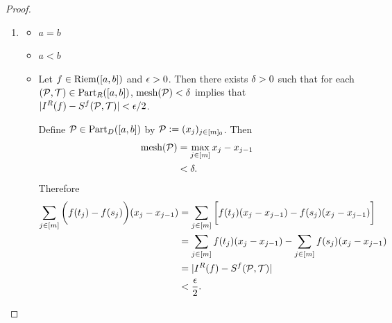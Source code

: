 \documentclass{book}
\begin{document}
	\begin{proof}\
		\begin{enumerate}
			\item 
			\begin{itemize}
				\item $a =b$
				\item $a < b$  
				\item Let $f \in \text{Riem}([a,b])$ and $\epsilon > 0$. Then there exists $\delta > 0$ such that for each $(\mathcal{P}, \mathcal{T}) \in \text{Part}_R([a,b])$, $\text{mesh}(\mathcal{P}) < \delta$ implies that $|I^R(f) - S^f(\mathcal{P}, \mathcal{T})| < \epsilon/2$. 
				
				Define $\mathcal{P} \in \text{Part}_D([a,b])$ by $\mathcal{P} \vcentcolon= (x_j)_{j \in [m]_0}$. Then 
				\begin{align*}
					\text{mesh}(\mathcal{P})
					& = \max\limits_{j \in [m]} x_j - x_{j-1} \\
					& < \delta. 
				\end{align*}
				Therefore
				\begin{align*}
					\sum\limits_{j \in [m]} \bigg( f(t_j) -  f(s_j)\bigg)  (x_j - x_{j-1})
					& = \sum\limits_{j \in [m]} \bigg[ f(t_j) (x_j - x_{j-1}) - f(s_j) (x_j - x_{j-1}) \bigg] \\
					& = \sum\limits_{j \in [m]} f(t_j) (x_j - x_{j-1})  - \sum\limits_{j \in [m]} f(s_j) (x_j - x_{j-1}) \\
					& = |I^R(f) - S^f(\mathcal{P}, \mathcal{T})| \\
					& < \frac{\epsilon}{2}.
				\end{align*}
				

\end{itemize}
\end{enumerate}
\end{proof}
\end{document}
